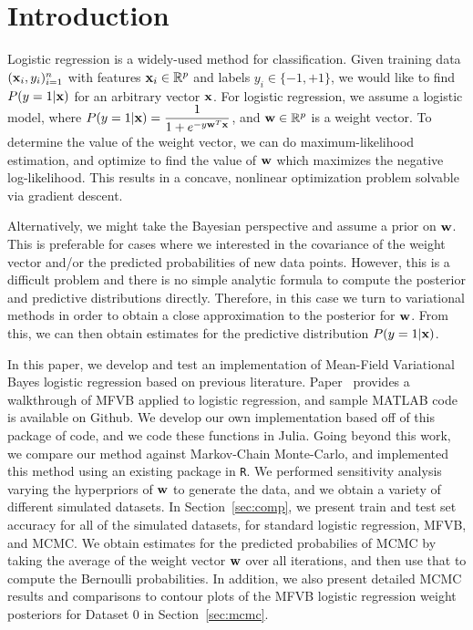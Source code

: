 
\section{Introduction}\label{sec:intro}

Logistic regression is a widely-used method for classification.  Given training data $(\boldsymbol{\mathbf{x}}_i, y_i)_{i=1}^n$ with features $\boldsymbol{\mathbf{x}}_i \in \mathbb{R}^p$ and labels $y_i \in \{-1,+1\}$, we would like to find $P(y = 1 | \boldsymbol{\mathbf{x}})$ for an arbitrary vector $\boldsymbol{\mathbf{x}}$.  For logistic regression, we assume a logistic model, where $P(y = 1 | \boldsymbol{\mathbf{x}}) = \dfrac{1}{1 + e^{-y\boldsymbol{\mathbf{w}}^T\boldsymbol{\mathbf{x}}}}$, and $\boldsymbol{\mathbf{w}} \in \mathbb{R}^p$ is a weight vector.  To determine the value of the weight vector, we can do maximum-likelihood estimation, and optimize to find the value of $\boldsymbol{\mathbf{w}}$ which maximizes the negative log-likelihood.  This results in a concave, nonlinear optimization problem solvable via gradient descent.

Alternatively, we might take the Bayesian perspective and assume a prior on $\boldsymbol{\mathbf{w}}$.  This is preferable for cases where we interested in the covariance of the weight vector and/or the predicted probabilities of new data points.   However, this is a difficult problem and there is no simple analytic formula to compute the posterior and predictive distributions directly.  Therefore, in this case we turn to variational methods in order to obtain a close approximation to the posterior for $\boldsymbol{\mathbf{w}}$.  From this, we can then obtain estimates for the predictive distribution $P(y = 1 | \boldsymbol{\mathbf{x}})$.  

In this paper, we develop and test an implementation of Mean-Field Variational Bayes logistic regression based on previous literature.  Paper~\cite{drugowitsch2013variational} provides a walkthrough of MFVB applied to logistic regression, and sample MATLAB code is available on Github.  We develop our own implementation based off of this package of code, and we code these functions in Julia. Going beyond this work, we compare our method against Markov-Chain Monte-Carlo, and implemented this method using an existing package in \texttt{R}.  We performed sensitivity analysis varying the hyperpriors of $\boldsymbol{\mathbf{w}}$ to generate the data, and we obtain a variety of different simulated datasets.  In Section~\ref{sec:comp}, we present train and test set accuracy for all of the simulated datasets, for standard logistic regression, MFVB, and MCMC.  We obtain estimates for the predicted probabilies of MCMC by taking the average of the weight vector $\boldsymbol{\mathbf{w}}$ over all iterations, and then use that to compute the Bernoulli probabilities.  In addition, we also present detailed MCMC results and comparisons to contour plots of the MFVB logistic regression weight posteriors for Dataset 0 in Section~\ref{sec:mcmc}.   

